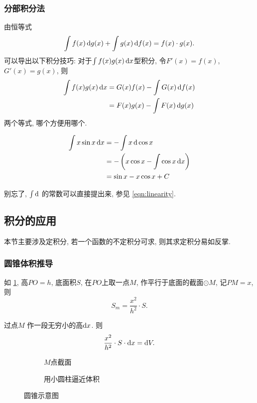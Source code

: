 \subsubsection*{分部积分法}
由恒等式
\[
  \int f(x)\mathop{}\!\mathrm{d} g(x) + \int g(x) \mathop{}\!\mathrm{d} f(x) = f(x)\cdot g(x)
.\]
可以导出以下积分技巧:
对于$\int f(x)g(x) \mathop{}\!\mathrm{d} x$型积分, 令$F'(x) = f(x)$, $G'(x) = g(x)$, 则
\begin{align*}
  \int f(x)g(x) \mathop{}\!\mathrm{d} x & = G(x)f(x) - \int G(x) \mathop{}\!\mathrm{d} f(x) \\
  & = F(x)g(x) - \int F(x) \mathop{}\!\mathrm{d} g(x)
\end{align*}
两个等式, 哪个方便用哪个.

\begin{example}
  \begin{align*}
    \int x \sin x\mathop{}\!\mathrm{d} x & = - \int x \mathop{}\!\mathrm{d} \cos x                          \\
    & = -\left(x \cos x - \int  \cos x \mathop{}\!\mathrm{d} x \right) \\
    & = \sin x - x \cos x +C
  \end{align*}
\end{example}
别忘了, $\int \mathop{}\!\mathrm{d}$  的常数可以直接提出来, 参见 \cref{eqn:linearity}.

\subsection{积分的应用}
本节主要涉及定积分, 若一个函数的不定积分可求, 则其求定积分易如反掌.

\subsubsection{圆锥体积推导}

如 \cref{fig:circular_cone}, 高$PO = h$, 底面积$S$, 在$PO$上取一点$M$,
作平行于底面的截面$\odot M$, 记$PM = x$, 则
\[
  S_m = \frac{x^{2}}{h^{2} } \cdot S
.\]

过点$M$ 作一段无穷小的高$\mathop{}\!\mathrm{d} x$.
则
\[
  \frac{x^{2}}{h^{2} }\cdot S \cdot \mathop{}\!\mathrm{d} x = \mathop{}\!\mathrm{d} V
.\]

\begin{figure}[htbp]
  \centering
    \begin{subfigure}{0.45\textwidth}
      \centering
      
      \caption{$M$点截面}\label{fig:circular_cone}
    \end{subfigure}
    \begin{subfigure}{0.45\textwidth}
      \centering
      
      \caption{用小圆柱逼近体积}\label{fig:circular_sim}
    \end{subfigure}
    \caption{圆锥示意图}
\end{figure}

